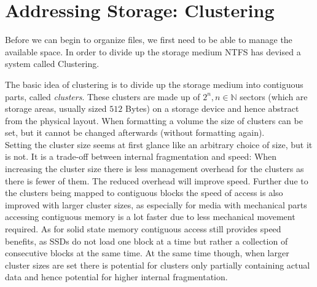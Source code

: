 \section{Addressing Storage: Clustering}
\label{sec:Cluster}
Before we can begin to organize files, we first need to be able to manage the available space. In order to divide up the storage medium NTFS has devised a system called Clustering.

The basic idea of clustering is to divide up the storage medium into contiguous parts, called \textit{clusters}. These clusters are made up of $2^n, n \in \mathbb{N}$\cite{microsoftinc:2018:DCS} sectors (which are storage areas, usually sized $512$ Bytes) on a storage device and hence abstract from the physical layout. When formatting a volume the size of clusters can be set, but it cannot be changed afterwards (without formatting again).\cite{RUSSINOVICH_ET_AL:2012:WI}\\
Setting the cluster size seems at first glance like an arbitrary choice of size, but it is not. It is a trade-off between internal fragmentation and speed:
When increasing the cluster size there is less management overhead for the clusters as there is fewer of them. The reduced overhead will improve speed.\cite{RUSSINOVICH_ET_AL:2012:WI} Further due to the clusters being mapped to contiguous blocks the speed of access is also improved with larger cluster sizes, as especially for media with mechanical parts accessing contiguous memory is a lot faster due to less mechanical movement required. As for solid state memory contiguous access still provides speed benefits, as SSDs do not load one block at a time but rather a collection of consecutive blocks at the same time.\cite{BELLOSA:2017:OS}
At the same time though, when larger cluster sizes are set there is potential for clusters only partially containing actual data and hence potential for higher internal fragmentation.


